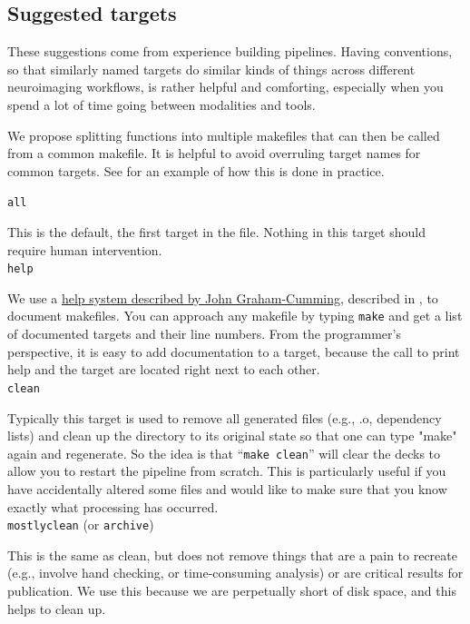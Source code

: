\subsection{Suggested targets}
These suggestions come from experience building pipelines. Having conventions, so that similarly named targets do similar kinds of things across different neuroimaging workflows, is rather helpful and comforting, especially when you spend a lot of time going between modalities and tools.

We propose splitting functions into multiple makefiles that can then be called from a common makefile. It is helpful to avoid overruling target names for common targets. See  for an example of how this is done in practice.

\texttt{all}

This is the default, the first target in the file. Nothing in this target should require human intervention. \\

\texttt{help} 

We use a \href{http://www.cmcrossroads.com/article/self-documenting-makefiles}{help system described by John Graham-Cumming}, described in , to document makefiles. You can approach any makefile by typing \texttt{make} and get a list of documented targets and their line numbers. From the programmer's perspective, it is easy to add documentation to a target, because the call to print help and the target are located right next to each other. \\

\texttt{clean} 

Typically this target is used to remove all generated files (e.g., .o, dependency lists) and clean up the directory to its original state so that one can type "make" again and regenerate. So the idea is that ``\texttt{make clean}'' will clear the decks to allow you to restart the pipeline from scratch. This is particularly useful if you have accidentally altered some files and would like to make sure that you know exactly what processing has occurred. \\

\texttt{mostlyclean} (or \texttt{archive})

This is the same as clean, but does not remove things that are a pain to recreate (e.g., involve hand checking, or time-consuming analysis) or are critical results for publication. We use this because we are perpetually short of disk space, and this helps to clean up.  \\



